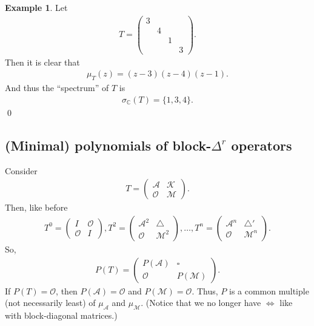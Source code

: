 \documentclass{article}
\theoremstyle{definition}
\newtheorem{exmp}{Example}[section]
\newcommand{\A}{\mathcal{A}}
\newcommand{\M}{\mathcal{M}}
\newcommand{\K}{\mathcal{K}}
\begin{document}
\begin{exmp}
	Let 
	\begin{align*}
	T = \begin{pmatrix}
	3 &&&\\
	&4&&\\
	&&1&\\
	&&&3
	\end{pmatrix}.
	\end{align*}
	Then it is clear that 
	\begin{align*}
	\mu_T(z) = (z-3)(z-4)(z-1).
	\end{align*}
	And thus the ``spectrum'' of $T$ is 
	\begin{align*}
	\sigma_{\mathbb{C}}(T) = \{1,3,4\}.
	\end{align*}
	\qed
\end{exmp}








\subsection{(Minimal) polynomials of block-$\Delta^r$ operators}


Consider 
\begin{align*}
T = \begin{pmatrix}
\A & \K \\
\mathcal{O} & \M
\end{pmatrix}.
\end{align*}
Then, like before
\begin{align*}
T^0 = \begin{pmatrix}
I & \mathcal{O}\\
\mathcal{O} & I
\end{pmatrix}, 
T^2 = \begin{pmatrix}
\A^2 & \triangle\\
\mathcal{O} & \M^2
\end{pmatrix}, 
\dots,
T^n = \begin{pmatrix}
\A^n & \triangle'\\
\mathcal{O} & \M^n
\end{pmatrix}.
\end{align*}
So, 
\begin{align*}
P(T) = \begin{pmatrix}
P(\A) & \square\\
\mathcal{O} & P(\M)
\end{pmatrix}.
\end{align*}
If $P(T) = \mathcal{O}$, then $P(\A) = \mathcal{O}$ and $P(\M) = \mathcal{O}$. Thus, $P$ is a common multiple (not necessarily least) of $\mu_\A$ and $\mu_\M$. (Notice that we no longer have $\iff$ like with block-diagonal matrices.) 
\end{document}
